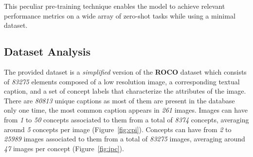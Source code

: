 \documentclass[10pt,twocolumn,letterpaper]{article}
\begin{document}
This peculiar pre-training technique enables the model to achieve relevant performance metrics on a wide array of zero-shot tasks while using a minimal dataset.

\subsection{Dataset Analysis}




The provided dataset is a \textit{simplified} version of the \textbf{ROCO} dataset\cite{roco} which consists of \textit{83275} elements composed of a low resolution image, a corresponding textual caption, and a set of concept labels that characterize the attributes of the image.
There are \textit{80813} unique captions as most of them are present in the database only one time, the most common caption appears in \textit{261} images.
Images can have from \textit{1} to \textit{50} concepts associated to them from a total of \textit{8374} concepts, averaging around \textit{5} concepts per image (Figure\ \ref{fig:cpi}).
Concepts can have from \textit{2} to \textit{25989} images associated to them from a total of \textit{83275} images, averaging around \textit{47} images per concept (Figure\ \ref{fig:ipc}).
\end{document}
